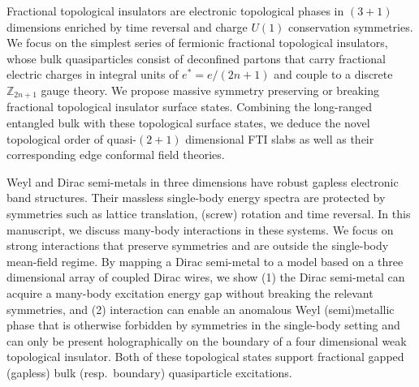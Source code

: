 
Fractional topological insulators are electronic topological phases in $(3+1)$ dimensions enriched by time reversal and charge $U(1)$ conservation symmetries. We focus on the simplest series of fermionic fractional topological insulators, whose bulk quasiparticles consist of deconfined partons that carry fractional electric charges in integral units of $e^\ast=e/(2n+1)$ and couple to a discrete $\mathbb{Z}_{2n+1}$ gauge theory. We propose massive symmetry preserving or breaking fractional topological insulator surface states. Combining the long-ranged entangled bulk with these topological surface states, we deduce the novel topological order of quasi-$(2+1)$ dimensional FTI slabs as well as their corresponding edge conformal field theories. 

Weyl and Dirac semi-metals in three dimensions have robust gapless electronic band structures. Their massless single-body energy spectra are protected by symmetries such as lattice translation, (screw) rotation and time reversal. In this manuscript, we discuss many-body  interactions in these systems. We focus on strong interactions that preserve symmetries and are outside the single-body mean-field regime. By mapping a Dirac semi-metal to a model based on a three dimensional array of coupled Dirac wires, we show (1) the Dirac semi-metal can acquire a many-body excitation energy gap without breaking the relevant symmetries, and (2) interaction can enable an anomalous Weyl (semi)metallic phase that is otherwise forbidden by symmetries in the single-body setting and can only be present holographically on the boundary of a four dimensional weak topological insulator. Both of these topological states support fractional gapped (gapless) bulk (resp.~boundary) quasiparticle excitations. %
